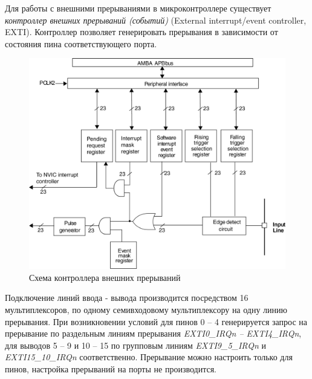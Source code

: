 Для работы с внешними прерываниями в микроконтроллере существует \textit{контроллер внешних прерываний (событий)} (External interrupt/event controller, EXTI). Контроллер позволяет генерировать прерывания в зависимости от состояния пина соответствующего порта.
\begin{figure}[h]
\begin{center}
\includegraphics[scale=0.15]{Image/65.jpg} 
\end{center}
\caption{Схема контроллера внешних прерываний}
\end{figure}

Подключение линий ввода - вывода производится посредством 16 мультиплексоров, по одному семивходовому мультиплексору на одну линию прерывания. При возникновении условий для пинов 0 -- 4 генерируется запрос на прерывание по раздельным линиям прерывания \textit{EXTI0\_IRQn -- EXTI4\_IRQn}, для выводов 5 -- 9 и 10 -- 15 по групповым линиям \textit{EXTI9\_5\_IRQn} и \textit{EXTI15\_10\_IRQn} соответственно. Прерывание можно настроить только для пинов, настройка прерываний на порты не производится.

